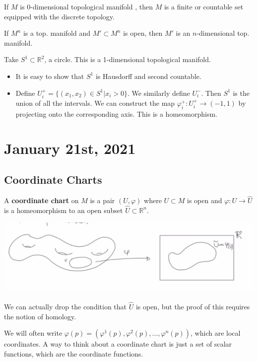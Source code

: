 \documentclass[12pt]{scrartcl}
\newcommand{\R}{\mathbb{R}}
\renewcommand{\hat}{\widehat}
\let \phi \varphi
\begin{document}
\begin{exercise} If $M$ is $0$-dimensional topological manifold , then $M$ is a finite or countable set equipped with the discrete topology.  
\end{exercise}
\begin{exercise} If $M^n$ is a top. manifold and $M' \subset M^n$ is open, then $M'$ is an $n$-dimensional top. manifold.  
\end{exercise}
\begin{example} Take $S^1 \subset \R^2$, a circle.  This is a 1-dimensional topological manifold.    
\begin{itemize}
\item It is easy to show that $S^1$ is Hausdorff and second countable.
\item Define $U_i^+ = \{(x_1, x_2) \in S^1 | x_i > 0\}.$  We similarly define $U_i^-$.  Then $S^1$ is the union of all the intervals.  We can construct the map $\phi_i^+ : U_i^+ \to (-1, 1)$ by projecting onto the corresponding axis.  This is a homeomorphism.  
\end{itemize}
\end{example}

\pagebreak
\section{January 21st, 2021}
\subsection{Coordinate Charts}
\begin{definition} A \textbf{coordinate chart} on $M$ is a pair $(U, \phi)$ where $U\subset M$ is open and $\phi: U \to \hat{U} $ is a homeomorphism to an open subset $\hat{U} \subset \R^n$.
\end{definition}

\includegraphics[scale=0.5]{chart.png}
\begin{remark} We can actually drop the condition that $\hat{U}$ is open, but the proof of this requires the notion of homology.

We will often write $\phi(p) = (\phi^1(p), \phi^2(p), \dots, \phi^n(p))$, which are local coordinates.  A way to think about a coordinate chart is just a set of scalar functions, which are the coordinate functions.  
\end{remark}
\end{document}
